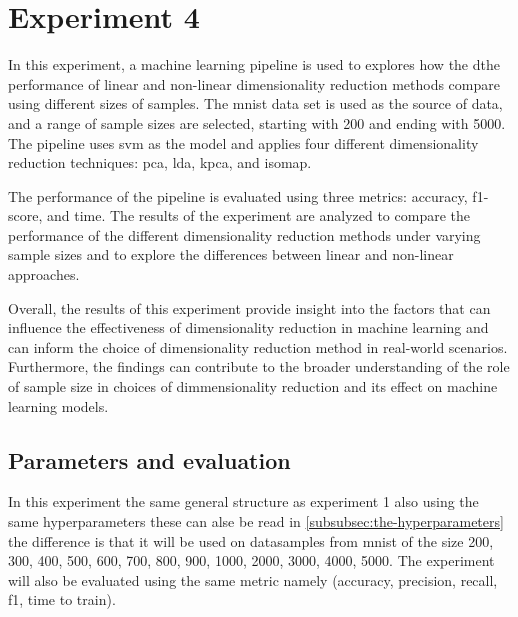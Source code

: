 \section{Experiment 4}\label{sec:experiment-4}

In this experiment, a machine learning pipeline is used to explores how the dthe performance of linear and non-linear dimensionality reduction methods compare using different sizes of samples. The \gls{mnist} data set is used as the source of data, and a range of sample sizes are selected, starting with 200 and ending with 5000. The pipeline uses \gls{svm} as the model and applies four different dimensionality reduction techniques: \gls{pca}, \gls{lda}, \gls{kpca}, and \gls{isomap}.

The performance of the pipeline is evaluated using three metrics: accuracy, f1-score, and time. The results of the experiment are analyzed to compare the performance of the different dimensionality reduction methods under varying sample sizes and to explore the differences between linear and non-linear approaches.

Overall, the results of this experiment provide insight into the factors that can influence the effectiveness of dimensionality reduction in machine learning and can inform the choice of dimensionality reduction method in real-world scenarios. Furthermore, the findings can contribute to the broader understanding of the role of sample size in choices of dimmensionality reduction and its effect on machine learning models.

\subsection{Parameters and evaluation}
In this experiment the same general structure as experiment 1 also using the same hyperparameters these can alse be read in \ref{subsubsec:the-hyperparameters} the difference is that it will be used on datasamples from \gls{mnist} of the size 200, 300, 400, 500, 600, 700, 800, 900, 1000, 2000, 3000, 4000, 5000. The experiment will also be evaluated using the same metric namely (accuracy, precision, recall, f1, time to train).





